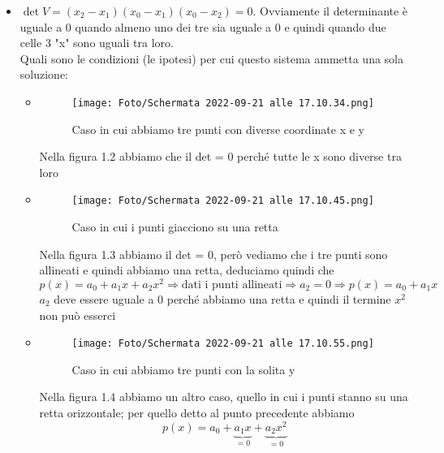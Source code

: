 \documentclass[a4paper, portrait]{book}
\numberwithin{equation}{chapter} %
\begin{document}
    \begin{itemize}
        \item $\det V = (x_2-x_1)(x_0-x_1)(x_0-x_2)=0$. Ovviamente il determinante è uguale a 0 quando almeno uno dei tre sia uguale a 0 e quindi quando due celle 3 "x" sono uguali tra loro.\\
        Quali sono le condizioni (le ipotesi) per cui questo sistema ammetta una sola soluzione:
        \begin{itemize}
            \item \begin{figure}
                \centering
                \texttt{[image: Foto/Schermata 2022-09-21 alle 17.10.34.png]}
                \caption{Caso in cui abbiamo tre punti con diverse coordinate x e y}
            \end{figure}
            Nella figura 1.2 abbiamo che il det = 0 perché tutte le x sono diverse tra loro 
            \item \begin{figure}
                \centering
                \texttt{[image: Foto/Schermata 2022-09-21 alle 17.10.45.png]}
                \caption{Caso in cui i punti giacciono su una retta}
            \end{figure}
            Nella figura 1.3 abbiamo il det = 0, però vediamo che i tre punti sono allineati e quindi abbiamo una retta, deduciamo quindi che \begin{equation}
                p(x) = a_0 + a_1 x + a_2 x^2 \Rightarrow \text{dati i punti allineati} \Rightarrow a_2 = 0 \Rightarrow p(x) = a_0 + a_1 x
            \end{equation}
            $a_2$ deve essere uguale a 0 perché abbiamo una retta e quindi il termine $x^2$ non può esserci
            \item \begin{figure}
                \centering
                \texttt{[image: Foto/Schermata 2022-09-21 alle 17.10.55.png]}
                \caption{Caso in cui abbiamo tre punti con la solita y}
            \end{figure}
            Nella figura 1.4 abbiamo un altro caso, quello in cui i punti stanno su una retta orizzontale; per quello detto al punto precedente abbiamo
            \begin{equation}
                p(x) = a_0 + \underbrace{a_1 x}_{=0} + \underbrace{a_2 x^2}_{=0}
            \end{equation}

\end{itemize}
\end{itemize}
\end{document}

